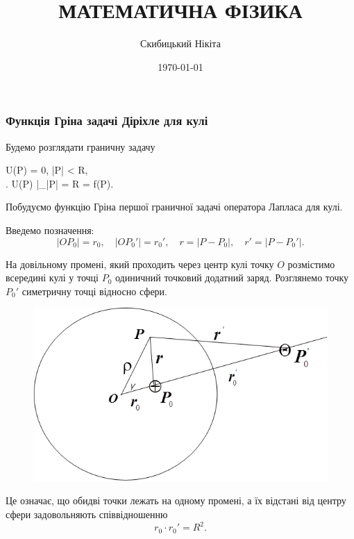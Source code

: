 

\title{{\Huge МАТЕМАТИЧНА ФІЗИКА}}
\author{Скибицький Нікіта}
\date{\today}





\tableofcontents

\setcounter{section}{4}
\setcounter{subsection}{4}
\setcounter{subsubsection}{3}
\setcounter{equation}{17}

\subsubsection{Функція Гріна задачі Діріхле для кулі}

Будемо розглядати граничну задачу
\begin{system}
	\Delta U(P) = 0, \quad |P| < R, \\
	\left. U(P) \right|_{|P| = R} = f(P).
\end{system}

Побудуємо функцію Гріна першої граничної задачі оператора Лапласа для кулі. \medskip

Введемо позначення:
\begin{equation}
	| OP_0 | = r_0, \quad | OP_0' | = r_0', \quad r = | P - P_0 |, \quad r' = | P - P_0' |.
\end{equation}
 
На довільному промені, який проходить через центр кулі точку $O$ розмістимо всередині кулі у точці $P_0$ одиничний точковий додатний заряд. Розглянемо точку $P_0'$ симетричну точці   відносно сфери.
\begin{figure}[H]
	\centering
	\includegraphics[width=.75\textwidth]{img/21-1.png}
\end{figure}

Це означає, що обидві точки лежать на одному промені, а їх відстані від центру сфери задовольняють співвідношенню
\begin{equation}
	r_0 \cdot r_0' = R^2.
\end{equation}

